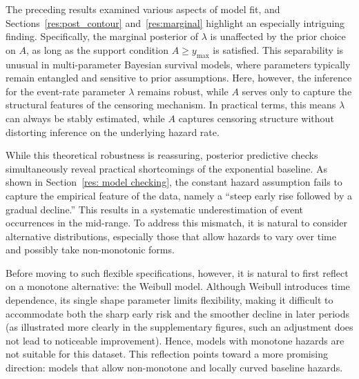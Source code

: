 The preceding results examined various aspects of model fit, and Sections~\ref{res:post_contour} and~\ref{res:marginal} highlight an especially intriguing finding. Specifically, the marginal posterior of $\lambda$ is unaffected by the prior choice on $A$, as long as the support condition $A \geq y_{\max}$ is satisfied. This separability is unusual in multi-parameter Bayesian survival models, where parameters typically remain entangled and sensitive to prior assumptions. Here, however, the inference for the event-rate parameter $\lambda$ remains robust, while $A$ serves only to capture the structural features of the censoring mechanism. In practical terms, this means $\lambda$ can always be stably estimated, while $A$ captures censoring structure without distorting inference on the underlying hazard rate. 

While this theoretical robustness is reassuring, posterior predictive checks simultaneously reveal practical shortcomings of the exponential baseline. As shown in Section~\ref{res: model checking}, the constant hazard assumption fails to capture the empirical feature of the data, namely a “steep early rise followed by a gradual decline.” This results in a systematic underestimation of event occurrences in the mid-range. To address this mismatch, it is natural to consider alternative distributions, especially those that allow hazards to vary over time and possibly take non-monotonic forms.

Before moving to such flexible specifications, however, it is natural to first reflect on a monotone alternative: the Weibull model. Although Weibull introduces time dependence, its single shape parameter limits flexibility, making it difficult to accommodate both the sharp early risk and the smoother decline in later periods (as illustrated more clearly in the supplementary figures, such an adjustment does not lead to noticeable improvement). Hence, models with monotone hazards are not suitable for this dataset. This reflection points toward a more promising direction: models that allow non-monotone and locally curved baseline hazards.

